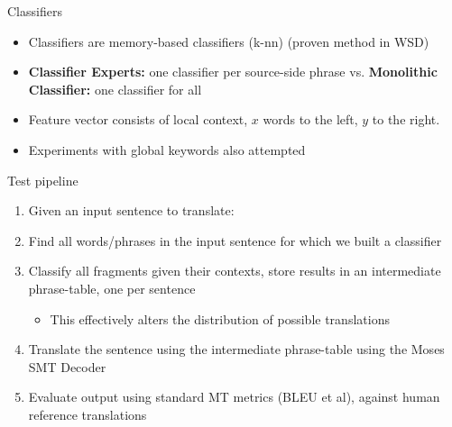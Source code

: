 \documentclass[compress]{beamer}
\begin{document}
\begin{frame}


  \begin{block}{Classifiers}
    \begin{itemize}
      \item Classifiers are memory-based classifiers (k-nn) (proven method in WSD)
      \item \textbf{Classifier Experts:} one classifier per
        source-side phrase  vs. \textbf{Monolithic Classifier:} one classifier for all
      \item Feature vector consists of local context, $x$ words to the left,
        $y$ to the right.
      \item Experiments with global keywords also attempted
    \end{itemize}
  \end{block}

\end{frame}
\begin{frame}
  
  \begin{block}{Test pipeline}
    \begin{enumerate}
      \item Given an input sentence to translate:
      \item Find all words/phrases in the input sentence for which we built a
        classifier
      \item Classify all fragments given their contexts,  store results in an
        intermediate phrase-table, one per sentence
      \begin{itemize}
        \item This effectively alters the distribution of possible translations
      \end{itemize}
      \item Translate the sentence using the intermediate phrase-table using the
      Moses SMT Decoder
      \item Evaluate output using standard MT metrics (BLEU et al), against
        human reference translations
    \end{enumerate}
  \end{block}

\end{frame}
\end{document}
